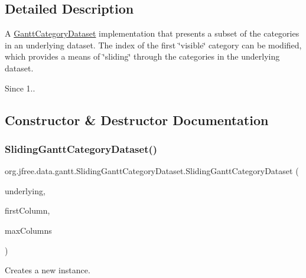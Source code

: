 \subsection{Detailed Description}
A \mbox{\hyperlink{interfaceorg_1_1jfree_1_1data_1_1gantt_1_1_gantt_category_dataset}{Gantt\+Category\+Dataset}} implementation that presents a subset of the categories in an underlying dataset. The index of the first \char`\"{}visible\char`\"{} category can be modified, which provides a means of \char`\"{}sliding\char`\"{} through the categories in the underlying dataset.

\begin{DoxySince}{Since}
1.. 
\end{DoxySince}


\subsection{Constructor \& Destructor Documentation}
\mbox{\label{classorg_1_1jfree_1_1data_1_1gantt_1_1_sliding_gantt_category_dataset_ac198107e31100e788859a0ed636c6b33}} 
\subsubsection{\texorpdfstring{Sliding\+Gantt\+Category\+Dataset()}{SlidingGanttCategoryDataset()}}
{\footnotesize\ttfamily org.\+jfree.\+data.\+gantt.\+Sliding\+Gantt\+Category\+Dataset.\+Sliding\+Gantt\+Category\+Dataset (\begin{DoxyParamCaption}\item[{\mbox{\hyperlink{interfaceorg_1_1jfree_1_1data_1_1gantt_1_1_gantt_category_dataset}{Gantt\+Category\+Dataset}}}]{underlying,  }\item[{int}]{first\+Column,  }\item[{int}]{max\+Columns }\end{DoxyParamCaption})}

Creates a new instance.


